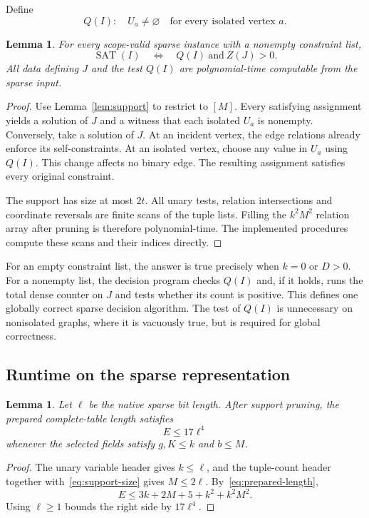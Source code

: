\documentclass[11pt,reqno]{amsart}
\numberwithin{equation}{section}
\newtheorem{lemma}[theorem]{Lemma}
\theoremstyle{definition}
\theoremstyle{remark}
\newcommand{\SAT}{\operatorname{SAT}}
\begin{document}
Define
\[
 Q(I):\quad U_a\ne\varnothing
 \quad\text{for every isolated vertex }a.
\]

\begin{lemma}\label{lem:normalization}
For every scope-valid sparse instance with a nonempty constraint list,
\begin{equation}\label{eq:decision-normalization}
 \SAT(I)\quad\Longleftrightarrow\quad Q(I)\ \text{and}\ Z(J)>0.
\end{equation}
All data defining $J$ and the test $Q(I)$ are polynomial-time computable from the sparse input.
\end{lemma}
\begin{proof}
Use Lemma~\ref{lem:support} to restrict to $[M]$. Every satisfying assignment yields a solution of $J$ and a witness that each isolated $U_a$ is nonempty. Conversely, take a solution of $J$. At an incident vertex, the edge relations already enforce its self-constraints. At an isolated vertex, choose any value in $U_a$ using $Q(I)$. This change affects no binary edge. The resulting assignment satisfies every original constraint.

The support has size at most $2t$. All unary tests, relation intersections and coordinate reversals are finite scans of the tuple lists. Filling the $k^2M^2$ relation array after pruning is therefore polynomial-time. The implemented procedures compute these scans and their indices directly.
\end{proof}

For an empty constraint list, the answer is true precisely when $k=0$ or $D>0$. For a nonempty list, the decision program checks $Q(I)$ and, if it holds, runs the total dense counter on $J$ and tests whether its count is positive. This defines one globally correct sparse decision algorithm. The test of $Q(I)$ is unnecessary on nonisolated graphs, where it is vacuously true, but is required for global correctness.

\subsection{Runtime on the sparse representation}

\begin{lemma}\label{lem:dense-expansion}
Let $\ell$ be the native sparse bit length. After support pruning, the prepared complete-table length satisfies
\begin{equation}\label{eq:dense-expansion}
 E\le17\ell^4
\end{equation}
whenever the selected fields satisfy $g,K\le k$ and $b\le M$.
\end{lemma}
\begin{proof}
The unary variable header gives $k\le\ell$, and the tuple-count header together with~\eqref{eq:support-size} gives $M\le2\ell$. By~\eqref{eq:prepared-length},
\[
 E\le3k+2M+5+k^2+k^2M^2.
\]
Using $\ell\ge1$ bounds the right side by $17\ell^4$.
\end{proof}
\end{document}
